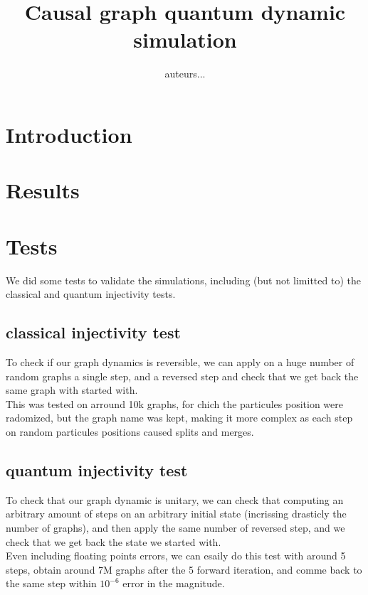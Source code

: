 \documentclass[11pt]{article}
\title{\textbf{Causal graph quantum dynamic simulation}}
\author{auteurs...}
\date{}
\begin{document}
\maketitle
\thispagestyle{empty}

\section{Introduction}

\section{Results}

\section{Tests}

We did some tests to validate the simulations, including (but not limitted to) the classical and quantum injectivity tests.

\subsection{classical injectivity test}

To check if our graph dynamics is reversible, we can apply on a huge number of random graphs a single step, and a reversed step and check that we get back the same graph with started with.\\

This was tested on arround 10k graphs, for chich the particules position were radomized, but the graph name was kept, making it more complex as each step on random particules positions caused splits and merges.

\subsection{quantum injectivity test}

To check that our graph dynamic is unitary, we can check that computing an arbitrary amount of steps on an arbitrary initial state (incrissing drasticly the number of graphs), and then apply the same number of reversed step, and we check that we get back the state we started with.\\

Even including floating points errors, we can esaily do this test with around 5 steps, obtain around 7M graphs after the 5 forward iteration, and comme back to the same step within $10^{-6}$ error in the magnitude.
\end{document}
